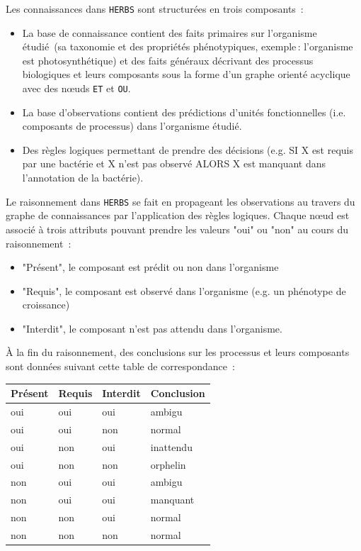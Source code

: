 \begin{refsegment}
Les connaissances dans \texttt{HERBS} sont structurées en trois composants :\nolisttopbreak
\begin{itemize}
    \item La base de connaissance contient des faits primaires sur l’organisme étudié (sa taxonomie  et des propriétés phénotypiques, exemple : l’organisme est photosynthétique) et des faits généraux décrivant des processus biologiques et leurs composants sous la forme d’un  graphe orienté acyclique avec des nœuds \texttt{ET} et \texttt{OU}.
    \item La base d’observations contient des prédictions d’unités fonctionnelles (i.e. composants de processus) dans l’organisme étudié.
    \item Des règles logiques permettant de prendre des décisions (e.g. SI X est requis par une bactérie et X n’est pas observé ALORS X est manquant dans l’annotation de la bactérie).
\end{itemize}

Le raisonnement dans \texttt{HERBS} se fait en propageant les observations au travers du graphe de connaissances par l’application des règles logiques. Chaque nœud est associé à trois attributs pouvant prendre les valeurs "oui" ou "non" au cours du raisonnement :\nolisttopbreak
\begin{itemize}
    \item "Présent", le composant est prédit ou non dans l’organisme
    \item "Requis", le composant est observé dans l’organisme (e.g. un phénotype de croissance)
    \item "Interdit", le composant n’est pas attendu dans l’organisme.
\end{itemize}

À la fin du raisonnement, des conclusions sur les processus et leurs composants sont données suivant cette table de correspondance :\nolisttopbreak
\begin{table}[H]
    \centering
    \label{tab:herbs_conclusion}
    \begin{tabular}{|l|l|l|>{\columncolor{LightCyan}}l|}
        \toprule
        \rowcolor{LightCyan}
        \textbf{Présent} & \textbf{Requis} & \textbf{Interdit} & \textbf{Conclusion} \\ 
        \midrule
        oui & oui & oui & ambigu \\ 
        \hline 
        oui & oui & non & normal \\ 
        \hline 
        oui & non & oui & inattendu \\ 
        \hline 
        oui & non & non & orphelin \\ 
        \hline 
        non & oui & oui & ambigu \\ 
        \hline 
        non & oui & oui & manquant \\ 
        \hline 
        non & non & oui & normal \\ 
        \hline 
        non & non & non & normal \\ 
        \bottomrule
    \end{tabular} 
\end{table}


\end{refsegment}
